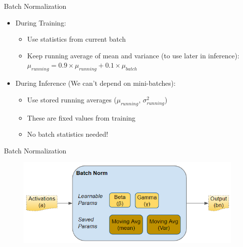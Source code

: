 \begin{frame}{Batch Normalization}
    \begin{itemize}
        \item During Training:
        \begin{itemize}
            \item Use statistics from current batch
            \item Keep running average of mean and variance (to use later in inference): \\
            $\mu_{running} = 0.9 \times \mu_{running} + 0.1 \times \mu_{batch}$
        \end{itemize}
        \vspace{0.5em}
        \item During Inference (We can't depend on mini-batches):
        \begin{itemize}
            \item Use stored running averages ($\mu_{running}$, $\sigma^2_{running}$)
            \item These are fixed values from training
            \item No batch statistics needed!
        \end{itemize}
    \end{itemize}
\end{frame}

\begin{frame}{Batch Normalization}
    \begin{figure}
    \centering
    \includegraphics[width=1.0\textwidth,height=1.0\textheight,keepaspectratio]{images/BatchNorm1.png}
    \end{figure}
\end{frame}

